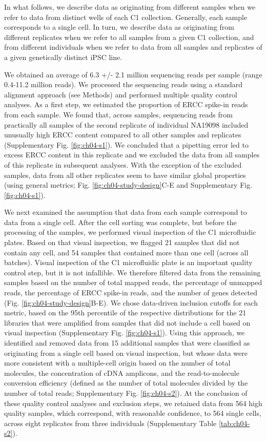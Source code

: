 In what follows, we describe data as originating from different samples
when we refer to data from distinct wells of each C1 collection.
Generally, each sample corresponds to a single cell. In turn, we
describe data as originating from different replicates when we refer to
all samples from a given C1 collection, and from different individuals
when we refer to data from all samples and replicates of a given
genetically distinct iPSC line.

We obtained an average of 6.3 +/- 2.1 million sequencing reads per
sample (range 0.4-11.2 million reads). We processed the sequencing reads
using a standard alignment approach (see Methods) and performed multiple
quality control analyses. As a first step, we estimated the proportion
of ERCC spike-in reads from each sample. We found that, across samples,
sequencing reads from practically all samples of the second replicate of
individual NA19098 included unusually high ERCC content compared to all
other samples and replicates (Supplementary Fig. \ref{fig:ch04-s1}). We concluded that
a pipetting error led to excess ERCC content in this replicate and we
excluded the data from all samples of this replicate in subsequent
analyses. With the exception of the excluded samples, data from all
other replicates seem to have similar global properties (using general
metrics; Fig. \ref{fig:ch04-study-design}C-E and Supplementary Fig. \ref{fig:ch04-s1}).

We next examined the assumption that data from each sample correspond to
data from a single cell. After the cell sorting was complete, but before
the processing of the samples, we performed visual inspection of the C1
microfluidic plates. Based on that visual inspection, we flagged 21
samples that did not contain any cell, and 54 samples that contained
more than one cell (across all batches). Visual inspection of the C1
microfluidic plate is an important quality control step, but it is not
infallible. We therefore filtered data from the remaining samples based
on the number of total mapped reads, the percentage of unmapped reads,
the percentage of ERCC spike-in reads, and the number of genes detected
(Fig. \ref{fig:ch04-study-design}B-E). We chose data-driven inclusion cutoffs for each metric,
based on the 95th percentile of the respective distributions for the 21
libraries that were amplified from samples that did not include a cell
based on visual inspection (Supplementary Fig. \ref{fig:ch04-s1}). Using this approach,
we identified and removed data from 15 additional samples that were
classified as originating from a single cell based on visual inspection,
but whose data were more consistent with a multiple-cell origin based on
the number of total molecules, the concentration of cDNA amplicons, and
the read-to-molecule conversion efficiency (defined as the number of
total molecules divided by the number of total reads; Supplementary Fig.
\ref{fig:ch04-s2}). At the conclusion of these quality control analyses and exclusion
steps, we retained data from 564 high quality samples, which correspond,
with reasonable confidence, to 564 single cells, across eight replicates
from three individuals (Supplementary Table \ref{tab:ch04-s2}).

